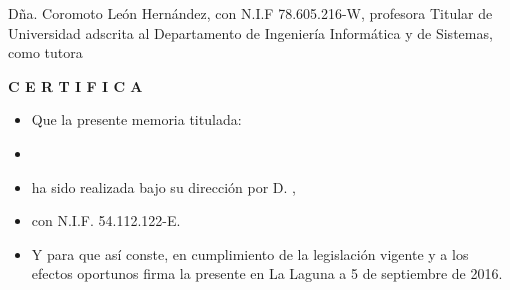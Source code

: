 

Dña. Coromoto León Hernández, con N.I.F 78.605.216-W, profesora Titular de Universidad adscrita al Departamento de Ingeniería Informática y de Sistemas, como tutora

\textbf{C E R T I F I C A}

\begin{itemize} 
\item[] Que la presente memoria titulada:
 
\item[] \say{\textit{\ThesisName{}}}
 
\item[] ha sido realizada bajo su dirección por D. \textbf{\AuthorName{}},
 
\item[] con N.I.F. 54.112.122-E.
 
\item[] Y para que así conste, en cumplimiento de la legislación vigente y a los efectos oportunos firma la presente en La Laguna a 5 de septiembre de 2016.
\\
\end{itemize}


 
 
\clearpage  %